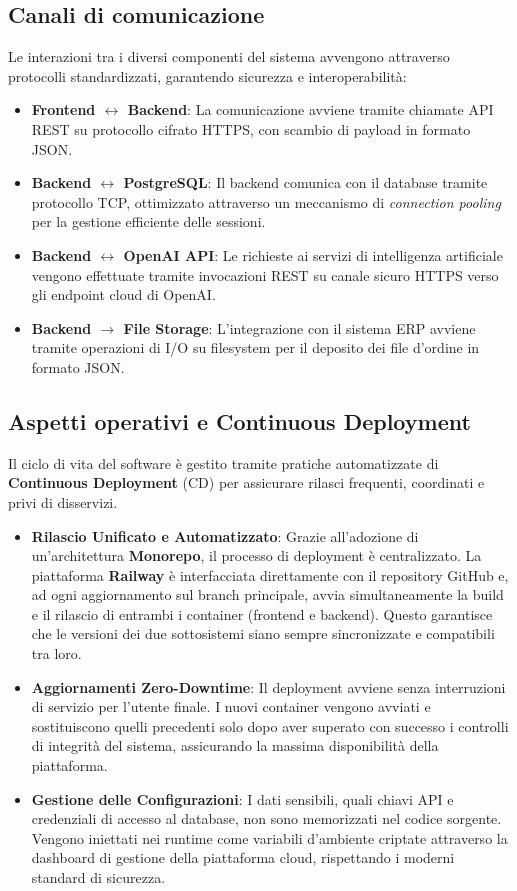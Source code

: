 \documentclass[a4paper, 11pt, oneside]{scrartcl}
\begin{document}
\subsection{Canali di comunicazione}
Le interazioni tra i diversi componenti del sistema avvengono attraverso protocolli standardizzati, garantendo sicurezza e interoperabilità:
\begin{itemize}
    \item \textbf{Frontend $\leftrightarrow$ Backend}: La comunicazione avviene tramite chiamate API REST su protocollo cifrato HTTPS, con scambio
      di payload in formato JSON.
    \item \textbf{Backend $\leftrightarrow$ PostgreSQL}: Il backend comunica con il database tramite protocollo TCP, ottimizzato attraverso un
      meccanismo di \textit{connection pooling} per la gestione efficiente delle sessioni.
    \item \textbf{Backend $\leftrightarrow$ OpenAI API}: Le richieste ai servizi di intelligenza artificiale vengono effettuate tramite invocazioni
      REST su canale sicuro HTTPS verso gli endpoint cloud di OpenAI.
    \item \textbf{Backend $\rightarrow$ File Storage}: L'integrazione con il sistema ERP avviene tramite operazioni di I/O su filesystem per il
      deposito dei file d'ordine in formato JSON.
\end{itemize}

\subsection{Aspetti operativi e Continuous Deployment}
Il ciclo di vita del software è gestito tramite pratiche automatizzate di \textbf{Continuous Deployment} (CD) per assicurare rilasci
frequenti, coordinati e privi di disservizi.
\begin{itemize}
    \item \textbf{Rilascio Unificato e Automatizzato}: Grazie all'adozione di un'architettura \textbf{Monorepo}, il processo di deployment è
     centralizzato. La piattaforma \textbf{Railway} è interfacciata direttamente con il repository GitHub e, ad ogni aggiornamento sul branch principale,
     avvia simultaneamente la build e il rilascio di entrambi i container (frontend e backend). Questo garantisce che le versioni dei due sottosistemi
     siano sempre sincronizzate e compatibili tra loro.
    \item \textbf{Aggiornamenti Zero-Downtime}: Il deployment avviene senza interruzioni di servizio per l'utente finale. I nuovi container vengono
     avviati e sostituiscono quelli precedenti solo dopo aver superato con successo i controlli di integrità del sistema, assicurando la massima
     disponibilità della piattaforma.
    \item \textbf{Gestione delle Configurazioni}: I dati sensibili, quali chiavi API e credenziali di accesso al database, non sono memorizzati nel
     codice sorgente. Vengono iniettati nei runtime come variabili d'ambiente criptate attraverso la dashboard di gestione della piattaforma cloud,
     rispettando i moderni standard di sicurezza.
\end{itemize}
\end{document}
